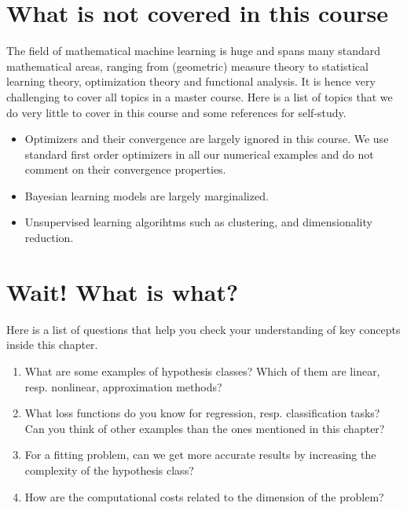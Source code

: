 \section*{What is not covered in this course}
The field of mathematical machine learning is huge and spans many standard
mathematical areas, ranging from (geometric) measure theory to statistical
learning theory, optimization theory and functional analysis. It is hence very
challenging to cover all topics in a master course. Here is a list of topics
that we do very little to cover in this course and some references for
self-study. 

\begin{itemize}
    \item Optimizers and their convergence are largely ignored in this course.
    We use standard first order optimizers in all our numerical examples and do
    not comment on their convergence properties. 
    \item Bayesian learning models are largely marginalized.
    \item Unsupervised learning algorihtms such as clustering, and
    dimensionality reduction.
\end{itemize}


\section*{Wait! What is what?}
Here is a list of questions that help you check your understanding of key
concepts inside this chapter.

\begin{enumerate}
    \item What are some examples of hypothesis classes? Which of them are
    linear, resp. nonlinear, approximation methods?
    \item What loss functions do you know for regression, resp. classification
    tasks? Can you think of other examples than the ones mentioned in this
    chapter?
    \item For a fitting problem, can we get more accurate results by increasing
    the complexity of the hypothesis class?
    \item How are the computational costs related to the dimension of the
    problem? 
\end{enumerate}

